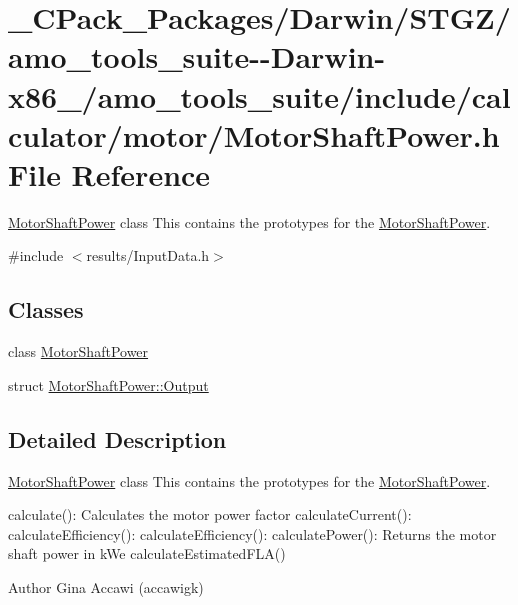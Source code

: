 \hypertarget{___c_pack___packages_2_darwin_2_s_t_g_z_2amo__tools__suite--_darwin-x86__64_2amo__tools__suite_25a2bab1d3b39e40805901bac3991bdf5}{}\section{\+\_\+\+C\+Pack\+\_\+\+Packages/\+Darwin/\+S\+T\+G\+Z/amo\+\_\+tools\+\_\+suite-\/-\/\+Darwin-\/x86\+\_/amo\+\_\+tools\+\_\+suite/include/calculator/motor/\+Motor\+Shaft\+Power.h File Reference}
\label{___c_pack___packages_2_darwin_2_s_t_g_z_2amo__tools__suite--_darwin-x86__64_2amo__tools__suite_25a2bab1d3b39e40805901bac3991bdf5}


\hyperlink{class_motor_shaft_power}{Motor\+Shaft\+Power} class This contains the prototypes for the \hyperlink{class_motor_shaft_power}{Motor\+Shaft\+Power}.  


{\ttfamily \#include $<$results/\+Input\+Data.\+h$>$}\newline
\subsection*{Classes}
\begin{DoxyCompactItemize}
\item 
class \hyperlink{class_motor_shaft_power}{Motor\+Shaft\+Power}
\item 
struct \hyperlink{struct_motor_shaft_power_1_1_output}{Motor\+Shaft\+Power\+::\+Output}
\end{DoxyCompactItemize}


\subsection{Detailed Description}
\hyperlink{class_motor_shaft_power}{Motor\+Shaft\+Power} class This contains the prototypes for the \hyperlink{class_motor_shaft_power}{Motor\+Shaft\+Power}. 

calculate()\+: Calculates the motor power factor calculate\+Current()\+: calculate\+Efficiency()\+: calculate\+Efficiency()\+: calculate\+Power()\+: Returns the motor shaft power in k\+We calculate\+Estimated\+F\+L\+A()

\begin{DoxyAuthor}{Author}
Gina Accawi (accawigk) 
\end{DoxyAuthor}
